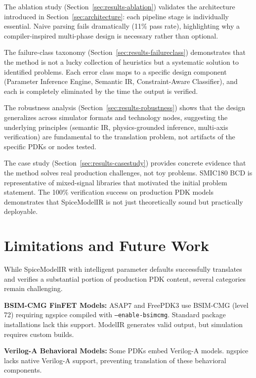 \documentclass[conference]{IEEEtran}
\begin{document}
The ablation study (Section~\ref{sec:results-ablation}) validates the architecture introduced in Section~\ref{sec:architecture}: each pipeline stage is individually essential. Naive parsing fails dramatically (11\% pass rate), highlighting why a compiler-inspired multi-phase design is necessary rather than optional.

The failure-class taxonomy (Section~\ref{sec:results-failureclass}) demonstrates that the method is not a lucky collection of heuristics but a systematic solution to identified problems. Each error class maps to a specific design component (Parameter Inference Engine, Semantic IR, Constraint-Aware Classifier), and each is completely eliminated by the time the output is verified.

The robustness analysis (Section~\ref{sec:results-robustness}) shows that the design generalizes across simulator formats and technology nodes, suggesting the underlying principles (semantic IR, physics-grounded inference, multi-axis verification) are fundamental to the translation problem, not artifacts of the specific PDKs or nodes tested.

The case study (Section~\ref{sec:results-casestudy}) provides concrete evidence that the method solves real production challenges, not toy problems. SMIC180 BCD is representative of mixed-signal libraries that motivated the initial problem statement. The 100\% verification success on production PDK models demonstrates that SpiceModelIR is not just theoretically sound but practically deployable.

\section{Limitations and Future Work}
\label{sec:limitations}

While SpiceModelIR with intelligent parameter defaults successfully translates and verifies a substantial portion of production PDK content, several categories remain challenging.

\textbf{BSIM-CMG FinFET Models:} ASAP7 and FreePDK3 use BSIM-CMG (level 72) requiring ngspice compiled with \texttt{--enable-bsimcmg}. Standard package installations lack this support. ModelIR generates valid output, but simulation requires custom builds.

\textbf{Verilog-A Behavioral Models:} Some PDKs embed Verilog-A models. ngspice lacks native Verilog-A support, preventing translation of these behavioral components.
\end{document}
